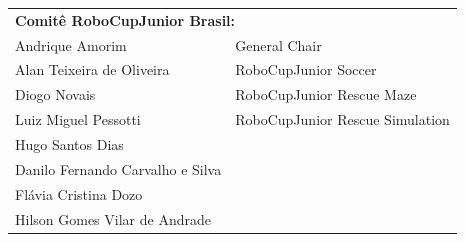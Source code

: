 \documentclass{article}
\begin{document}
\begin{center}
\begin{tabular}{ll}
    \multicolumn{2}{l}{\textbf{Comit\^e RoboCupJunior Brasil:}}\\
    Andrique Amorim            & General Chair \\
    Alan Teixeira de Oliveira  & RoboCupJunior Soccer \\
    Diogo Novais               & RoboCupJunior Rescue Maze \\
    Luiz Miguel Pessotti       & RoboCupJunior Rescue Simulation \\
    Hugo Santos Dias           &  \\
    Danilo Fernando Carvalho e Silva &  \\
    Fl\'avia Cristina Dozo  &  \\
    Hilson Gomes Vilar de Andrade &  \\
\end{tabular}
\end{center}

\vspace{20pt}
\end{document}
